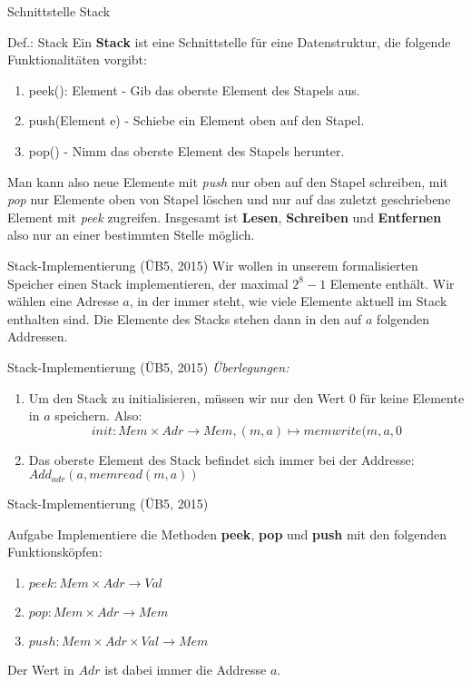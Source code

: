 \begin{frame}{Schnittstelle Stack}
	\begin{block}{Def.: Stack}
		Ein \textbf{Stack} ist eine Schnittstelle für eine Datenstruktur, die folgende Funktionalitäten vorgibt:
		\begin{enumerate}
			\item peek(): Element  -  Gib das oberste Element des Stapels aus.
			\item push(Element e)  -  Schiebe ein Element oben auf den Stapel.
			\item pop()  -  Nimm das oberste Element des Stapels herunter.
		\end{enumerate}

		\medskip

		Man kann also neue Elemente mit \textit{push} nur oben auf den Stapel schreiben, mit \textit{pop} nur Elemente oben von Stapel löschen und nur auf das zuletzt geschriebene Element mit \textit{peek} zugreifen. Insgesamt ist \textbf{Lesen}, \textbf{Schreiben} und \textbf{Entfernen} also nur an einer bestimmten Stelle möglich.
	\end{block}
\end{frame}

\begin{frame}{Stack-Implementierung (ÜB5, 2015)}
	Wir wollen in unserem formalisierten Speicher einen Stack implementieren, der maximal $2^8 - 1$ Elemente enthält. Wir wählen eine Adresse $a$, in der immer steht, wie viele Elemente aktuell im Stack enthalten sind. Die Elemente des Stacks stehen dann in den auf $a$ folgenden Addressen.
\end{frame}
	
\begin{frame}{Stack-Implementierung (ÜB5, 2015)}
	\emph{Überlegungen:}
	\begin{enumerate}
		\item Um den Stack zu initialisieren, müssen wir nur den Wert $0$ für keine Elemente in $a$ speichern. Also:
			\[init: Mem \times Adr \to Mem, (m,a) \mapsto memwrite(m,a,0\]
		\item Das oberste Element des Stack befindet sich immer bei der Addresse: $Add_{adr}(a, memread(m,a))$
	\end{enumerate}
\end{frame}

\begin{frame}{Stack-Implementierung (ÜB5, 2015)}
	\begin{exampleblock}{Aufgabe}
		Implementiere die Methoden \textbf{peek}, \textbf{pop} und \textbf{push} mit den folgenden Funktionsköpfen:
		\begin{enumerate}
			\item $peek: Mem \times Adr \to Val$
			\item $pop: Mem \times Adr \to Mem$
			\item $push: Mem \times Adr \times Val \to Mem$
		\end{enumerate}
		Der Wert in $Adr$ ist dabei immer die Addresse $a$.
	\end{exampleblock}
\end{frame}

